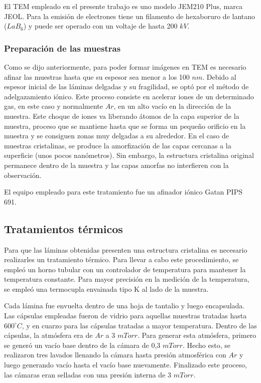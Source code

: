 \documentclass[12pt]{article}
\theoremstyle{definition}
\theoremstyle{remark}
\begin{document}
{El TEM empleado en el presente trabajo es uno modelo JEM210 Plus, marca JEOL. Para la emisión de electrones tiene un filamento de hexaboruro de lantano ($LaB_6$) y puede ser operado con un voltaje de hasta 200 $kV$.

\subsubsection{Preparación de las muestras}

Como se dijo anteriormente, para poder formar imágenes en TEM es necesario afinar las muestras hasta que su espesor sea menor a los 100 $nm$. Debido al espesor inicial de las láminas delgadas y su fragilidad, se optó por el método de adelgazamiento iónico. Este proceso consiste en acelerar iones de un determinado gas, en este caso y normalmente $Ar$, en un alto vacío en la dirección de la muestra. Este choque de iones va liberando átomos de la capa superior de la muestra, proceso que se mantiene hasta que se forma un pequeño orificio en la muestra y se consiguen zonas muy delgadas a su alrededor. En el caso de muestras cristalinas, se produce la amorfización de las capas cercanas a la superficie (unos pocos nanómetros). Sin embargo, la estructura cristalina original permanece dentro de la muestra y las capas amorfas no interfieren con la observación. 

El equipo empleado para este tratamiento fue un afinador iónico Gatan PIPS 691.
 

\subsection{Tratamientos térmicos}

Para que las láminas obtenidas presenten una estructura cristalina es necesario realizarles un tratamiento térmico. Para llevar a cabo este procedimiento, se empleó un horno tubular con un controlador de temperatura para mantener la temperatura constante. Para mayor precisión en la medición de la temperatura, se empleó una termocupla envainada tipo K al lado de la muestra. 

Cada lámina fue envuelta dentro de una hoja de tantalio y luego encapsulada.
Las cápsulas empleadas fueron de vidrio para aquellas muestras tratadas hasta $600 ^\circ C$, y en cuarzo para las cápsulas tratadas a mayor temperatura. Dentro de las cápsulas, la atmósfera era de $Ar$ a 3 $mTorr$. Para generar esta atmósfera, primero se generó un vacío base dentro de la cámara de 0,3 $mTorr$. Hecho esto, se realizaron tres lavados llenando la cámara hasta presión atmosférica con $Ar$ y luego generando vacío hasta el vacío base nuevamente. Finalizado este proceso, las cámaras eran selladas con una presión interna de 3 $mTorr$.

}
\end{document}
